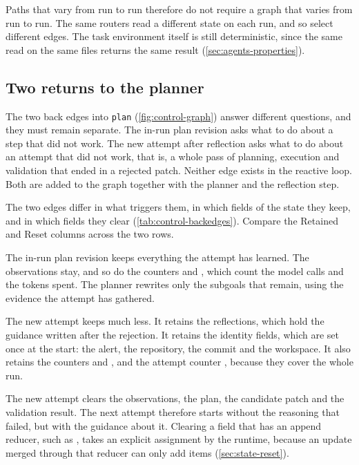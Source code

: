 Paths that vary from run to run therefore do not require a graph that varies from run to run. The
same routers read a different state on each run, and so select different edges. The task
environment itself is still deterministic, since the same read on the same files returns the same
result (\cref{sec:agents-properties}).

\subsection{Two returns to the planner}
\label{sec:control-backedges}

The two back edges into \texttt{plan} (\cref{fig:control-graph}) answer different questions, and
they must remain separate. The in-run plan revision asks what to do about a step that did not work.
The new attempt after reflection asks what to do about an attempt that did not work, that is, a
whole pass of planning, execution and validation that ended in a rejected patch. Neither edge
exists in the reactive loop. Both are added to the graph together with the planner and the
reflection step.

The two edges differ in what triggers them, in which fields of the state they keep, and in which
fields they clear (\cref{tab:control-backedges}). Compare the Retained and Reset columns across the
two rows.

The in-run plan revision keeps everything the attempt has learned. The observations stay, and so do
the counters  and , which count the model calls and the tokens
spent. The planner rewrites only the subgoals that remain, using the evidence the attempt has
gathered.

The new attempt keeps much less. It retains the reflections, which hold the guidance written after
the rejection. It retains the identity fields, which are set once at the start: the alert, the
repository, the commit and the workspace. It also retains the counters  and
, and the attempt counter , because they cover the whole run.

The new attempt clears the observations, the plan, the candidate patch and the validation result.
The next attempt therefore starts without the reasoning that failed, but with the guidance about
it. Clearing a field that has an append reducer, such as , takes an explicit
assignment by the runtime, because an update merged through that reducer can only add items
(\cref{sec:state-reset}).

